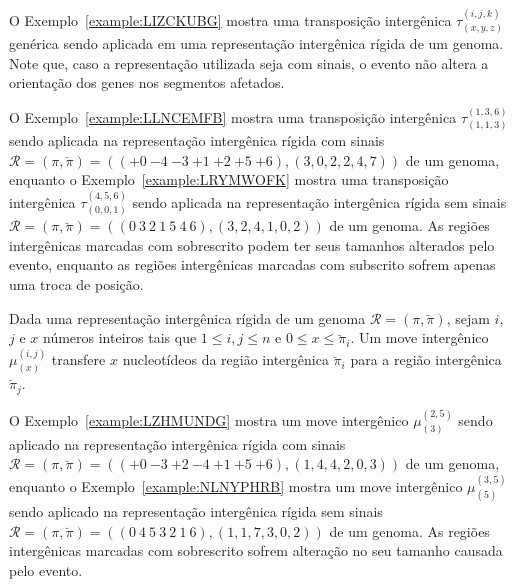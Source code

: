 O Exemplo~\ref{example:LIZCKUBG} mostra uma transposição intergênica $\tau^{(i,j,k)}_{(x,y,z)}$ genérica sendo aplicada em uma representação intergênica rígida de um genoma. Note que, caso a representação utilizada seja com sinais, o evento não altera a orientação dos genes nos segmentos afetados.

\pagebreak



O Exemplo~\ref{example:LLNCEMFB} mostra uma transposição intergênica $\tau^{(1,3,6)}_{(1,1,3)}$ sendo aplicada na representação intergênica rígida com sinais $\mathcal{R} = (\pi,\breve\pi) = \allowbreak(({+0}~{-4}~{-3}~{+1}~{+2}~{+5}~{+6}),\allowbreak(3,0,2,2,4,7))$ de um genoma, enquanto o Exemplo~\ref{example:LRYMWOFK} mostra uma transposição intergênica $\tau^{(4,5,6)}_{(0,0,1)}$ sendo aplicada na representação intergênica rígida sem sinais $\mathcal{R} = (\pi,\breve\pi) = \allowbreak(({0}~{3}~{2}~{1}~{5}~{4}~{6}),\allowbreak(3,2,4,1,0,2))$ de um genoma. As regiões intergênicas marcadas com sobrescrito podem ter seus tamanhos alterados pelo evento, enquanto as regiões intergênicas marcadas com subscrito sofrem apenas uma troca de posição.





\begin{definition}
Dada uma representação intergênica rígida de um genoma $\mathcal{R} = (\pi,\breve\pi)$, sejam $i$, $j$ e $x$ números inteiros tais que $1 \le i, j \le n$ e $0 \le x \le \breve\pi_i$. Um move intergênico $\mu^{(i,j)}_{(x)}$ transfere $x$ nucleotídeos da região intergênica $\breve\pi_i$ para a região intergênica $\breve\pi_{j}$.
\end{definition}

O Exemplo~\ref{example:LZHMUNDG} mostra um move intergênico $\mu^{(2,5)}_{(3)}$ sendo aplicado na representação intergênica rígida com sinais $\mathcal{R} = (\pi,\breve\pi) = \allowbreak(({+0}~{-3}~{+2}~{-4}~{+1}~{+5}~{+6}),\allowbreak(1,4,4,2,0,3))$ de um genoma, enquanto o Exemplo~\ref{example:NLNYPHRB} mostra um move intergênico $\mu^{(3,5)}_{(5)}$ sendo aplicado na representação intergênica rígida sem sinais $\mathcal{R} = (\pi,\breve\pi) = \allowbreak(({0}~{4}~{5}~{3}~{2}~{1}~{6}),\allowbreak(1,1,7,3,0,2))$ de um genoma. As regiões intergênicas marcadas com sobrescrito sofrem alteração no seu tamanho causada pelo evento.



